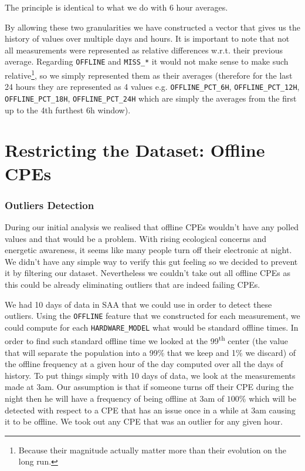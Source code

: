 The principle is identical to what we do with 6 hour averages.

By allowing these two granularities we have constructed a vector that gives us the history of values over multiple days and hours. It is important to note that not all measurements were represented as relative differences w.r.t. their previous average. Regarding \texttt{OFFLINE} and \texttt{MISS\_*} it would not make sense to make such relative\footnote{Because their magnitude actually matter more than their evolution on the long run.}, so we simply represented them as their averages (therefore for the last 24 hours they are represented as 4 values e.g. \texttt{OFFLINE\_PCT\_6H}, \texttt{OFFLINE\_PCT\_12H}, \texttt{OFFLINE\_PCT\_18H}, \texttt{OFFLINE\_PCT\_24H} which are simply the averages from the first up to the 4th furthest 6h window).

\section{Restricting the Dataset: Offline CPEs}
\subsubsection{Outliers Detection}
During our initial analysis we realised that offline CPEs wouldn't have any polled values and that would be a problem. With rising ecological concerns and energetic awareness, it seems like many people turn off their electronic at night. We didn't have any simple way to verify this gut feeling so we decided to prevent it by filtering our dataset. Nevertheless we couldn't take out all offline CPEs as this could be already eliminating outliers that are indeed failing CPEs. 

We had 10 days of data in SAA that we could use in order to detect these outliers. Using the \texttt{OFFLINE} feature that we constructed for each measurement, we could compute for each \texttt{HARDWARE\_MODEL} what would be standard offline times. In order to find such standard offline time we looked at the 99\textsuperscript{th} center (the value that will separate the population into a 99\% that we keep and 1\% we discard) of the offline frequency at a given hour of the day computed over all the days of history. To put things simply with 10 days of data, we look at the measurements made at 3am. Our assumption is that if someone turns off their CPE during the night then he will have a frequency of being offline at 3am of $100\%$ which will be detected with respect to a CPE that has an issue once in a while at 3am causing it to be offline. We took out any CPE that was an outlier for any given hour. 

